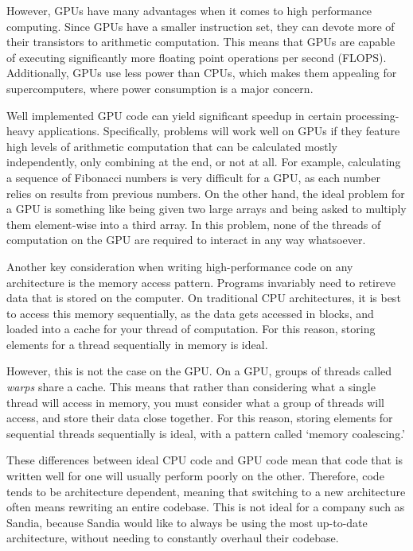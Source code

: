 However, GPUs have
many advantages when it comes to high performance computing. Since GPUs have
a smaller instruction set, they can devote more of their transistors to
arithmetic computation. This means that GPUs are capable of executing
significantly more floating point operations per second (FLOPS). Additionally,
GPUs use less power than CPUs, which makes them appealing for supercomputers,
where power consumption is a major concern.

Well implemented GPU code can yield significant speedup in certain
processing-heavy applications. Specifically, problems will work well on GPUs if they feature high 
levels of arithmetic computation that can be calculated mostly independently, only combining at the end,
or not at all. For example, calculating a sequence of Fibonacci numbers is very difficult for a GPU, as
each number relies on results from previous numbers. On the other hand, the ideal problem for a GPU is something 
like being given two large arrays and being asked to multiply them element-wise into a third array. In this problem,
none of the threads of computation on the GPU are required to interact in any way whatsoever.

Another key consideration when writing high-performance code on any architecture is the memory access pattern.
Programs invariably need to retireve data that is stored on the computer. On traditional CPU architectures, it is
best to access this memory sequentially, as the data gets accessed in blocks, and loaded into a cache for your 
thread of computation. For this reason, storing elements for a thread sequentially in memory is ideal.

However, this is not the case on the GPU. On a GPU, groups of threads called \emph{warps} share a cache. This means that
rather than considering what a single thread will access in memory, you must consider what a group of threads will access,
and store their data close together. For this reason, storing elements for sequential threads sequentially is ideal, with a
pattern called `memory coalescing.'

These differences between ideal CPU code and GPU code mean that code that is written well for one will usually perform poorly 
on the other. Therefore, code tends to be architecture dependent, meaning that switching to a new architecture 
often means rewriting an entire codebase. This is not ideal for a company such as Sandia, because Sandia would like 
to always be using the most up-to-date architecture, without needing to constantly overhaul their codebase.


